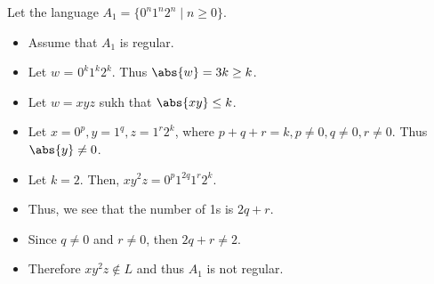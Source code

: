 Let the language $A_1 = \{\text{0}^n\text{1}^n\text{2}^n \mid n \geq 0\}$.
\begin{itemize}
	\item Assume that $A_1$ is regular.
	\item Let $w$ = $\text{0}^k\text{1}^k\text{2}^k$. Thus $\abs{w} = 3k \geq k$.
	\item Let $w = xyz$ sukh that $\abs{xy} \leq k$.
	\item Let $x = \text{0}^p, y = \text{1}^q, z = \text{1}^r\text{2}^k$, where $p+q+r = k, p \neq 0, q \neq 0, r \neq 0$. Thus $\abs{y} \neq 0$.
	\item Let $k=2$. Then, $xy^2z = \text{0}^p\text{1}^{2q}\text{1}^r\text{2}^k$.
	\item Thus, we see that the number of 1s is $2q + r$.
	\item Since $q \neq 0$ and $r \neq 0$, then $2q + r \neq 2$.
	\item Therefore $xy^2z \notin L$ and thus $A_1$ is not regular.
\end{itemize}